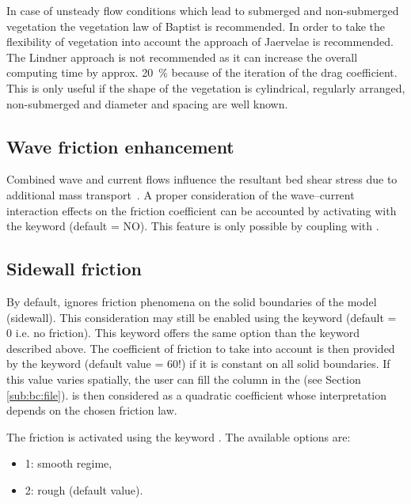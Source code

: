 In case of unsteady flow conditions which lead to
submerged and non-submerged vegetation
the vegetation law of Baptist is recommended.
In order to take the flexibility of vegetation
into account the approach of Jaervelae is recommended.
The Lindner approach is not recommended as it can increase the overall computing
time by approx. 20~\% because of the iteration of the drag coefficient.
This is only useful if the shape of the vegetation is cylindrical,
regularly arranged, non-submerged and
diameter and spacing are well known.

\subsection{Wave friction enhancement}

Combined wave and current flows influence the resultant bed shear stress due to
additional mass transport~\cite{OConnorYoo1988}.
A proper consideration of the wave--current interaction effects on the friction
coefficient can be accounted by activating with the keyword
 (default = NO).
This feature is only possible by coupling  with \tomawac.


\subsection{Sidewall friction}

By default,  ignores friction phenomena on the solid boundaries
of the model (sidewall).
This consideration may still be enabled using the keyword
 (default = 0 i.e. no friction).
This keyword offers the same option than the keyword
 described above.
The coefficient of friction to take into account is then provided
by the keyword 
(default value = 60!) if it is constant on all solid boundaries.
If this value varies spatially, the user can fill the column 
in the  (see Section \ref{sub:bc:file}).
 is then considered as a quadratic coefficient whose
interpretation depends on the chosen friction law.

The friction is activated using the keyword
.
The available options are:

\begin{itemize}
\item 1: smooth regime,

\item 2: rough (default value).
\end{itemize}

